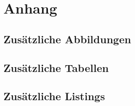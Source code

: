 \section{Anhang}

\subsection{Zusätzliche Abbildungen}
\label{app:abbildungen}


\subsection{Zusätzliche Tabellen}
\label{app:tabellen}


\subsection{Zusätzliche Listings}
\label{app:listings}


